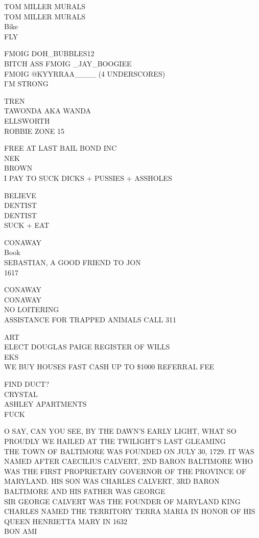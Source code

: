 \documentclass[10pt,letterpaper]{article}
\begin{document}
TOM MILLER MURALS\\
TOM MILLER MURALS\\
Bike\\
FLY

FMOIG DOH\_BUBBLES12\\
BITCH ASS FMOIG \_JAY\_BOOGIEE\\
FMOIG @KYYRRAA\_\_\_\_ (4 UNDERSCORES)\\
I'M STRONG

TREN\\
TAWONDA AKA WANDA\\
ELLSWORTH\\
ROBBIE ZONE 15

FREE AT LAST BAIL BOND INC\\
NEK\\
BROWN\\
I PAY TO SUCK DICKS + PUSSIES + ASSHOLES

BELIEVE\\
DENTIST\\
DENTIST\\
SUCK + EAT

CONAWAY\\
Book\\
SEBASTIAN, A GOOD FRIEND TO JON\\
1617

CONAWAY\\
CONAWAY\\
NO LOITERING\\
ASSISTANCE FOR TRAPPED ANIMALS CALL 311

ART\\
ELECT DOUGLAS PAIGE REGISTER OF WILLS\\
EKS\\
WE BUY HOUSES FAST CASH UP TO \$1000 REFERRAL FEE

FIND DUCT?\\
CRYSTAL\\
ASHLEY APARTMENTS\\
FUCK

O SAY, CAN YOU SEE, BY THE DAWN'S EARLY LIGHT, WHAT SO PROUDLY WE HAILED AT THE TWILIGHT'S LAST GLEAMING\\
THE TOWN OF BALTIMORE WAS FOUNDED ON JULY 30, 1729.  IT WAS NAMED AFTER CAECILIUS CALVERT, 2ND BARON BALTIMORE WHO WAS THE FIRST PROPRIETARY GOVERNOR OF THE PROVINCE OF MARYLAND.  HIS SON WAS CHARLES CALVERT, 3RD BARON BALTIMORE AND HIS FATHER WAS GEORGE\\
SIR GEORGE CALVERT WAS THE FOUNDER OF MARYLAND KING CHARLES NAMED THE TERRITORY TERRA MARIA IN HONOR OF HIS QUEEN HENRIETTA MARY IN 1632\\
BON AMI
\end{document}
